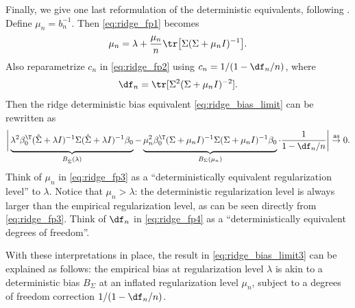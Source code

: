 \documentclass{article}
\begin{document}
Finally, we give one last reformulation of the deterministic equivalents,
following \citet{lejeune2022asymptotics, bach2023high}. Define $\mu_n =
b_n^{-1}$. Then \eqref{eq:ridge_fp1} becomes 
\begin{equation}
\label{eq:ridge_fp3}
\mu_n = \lambda + \frac{\mu_n}{n} \tr \big[ \Sigma (\Sigma + \mu_n I)^{-1}
\big].
\end{equation}
Also reparametrize $c_n$ in \eqref{eq:ridge_fp2} using $c_n = 1 / (1 -
\df_n / n)$, where 
\begin{equation}
\label{eq:ridge_fp4}
\df_n = \tr [ \Sigma^2 (\Sigma + \mu_n I)^{-2} ].
\end{equation}
Then the ridge deterministic bias equivalent \eqref{eq:ridge_bias_limit} can be
rewritten as
\begin{equation}
\label{eq:ridge_bias_limit3}
\bigg| \underbrace{ \lambda^2 \beta_0^\T (\hSigma + \lambda I)^{-1} \Sigma  
  (\hSigma + \lambda I)^{-1} \beta_0 \vphantom{ \Big] } }_{B_{\hSigma}(\lambda)}
- \underbrace{ \mu_n^2 \beta_0^\T(\Sigma + \mu_n I)^{-1} \Sigma (\Sigma + \mu_n
  I)^{-1} \beta_0 \vphantom{ \Big] }}_{B_\Sigma(\mu_n)} \cdot \frac{1}{1 - \df_n
  / n} \bigg| \asto 0.
\end{equation}
Think of $\mu_n$ in \eqref{eq:ridge_fp3} as a ``deterministically equivalent
regularization level'' to $\lambda$. Notice that $\mu_n > \lambda$: the
deterministic regularization level is always larger than the empirical
regularization level, as can be seen directly from \eqref{eq:ridge_fp3}. Think
of $\df_n$ in \eqref{eq:ridge_fp4} as a ``deterministically equivalent degrees
of freedom''.   

With these interpretations in place, the result in \eqref{eq:ridge_bias_limit3}
can be explained as follows: the empirical bias  at
regularization level $\lambda$ is akin to a deterministic bias $B_\Sigma$ at an
inflated regularization level $\mu_n$, subject to a degrees of freedom
correction $1 / (1 - \df_n / n)$.  



\end{document}
